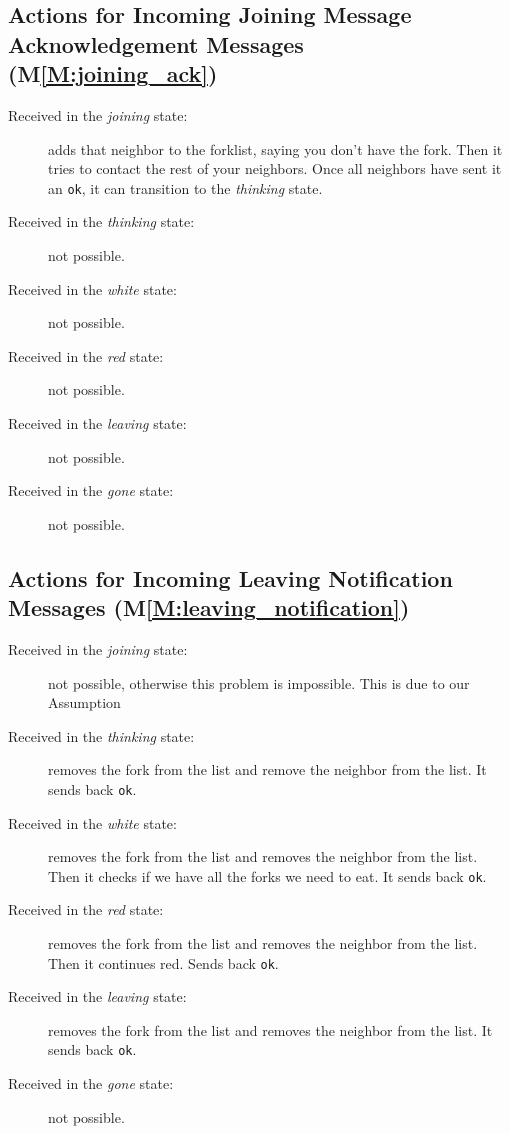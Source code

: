 \documentclass[11pt]{article}
\begin{document}
\subsection{Actions for Incoming Joining Message Acknowledgement Messages (M\ref{M:joining_ack})}
\begin{description}
\item[Received in the \textit{joining} state:] adds that neighbor to the forklist, saying you don't have the fork. Then it tries to contact the rest of your neighbors. Once all neighbors have sent it an \texttt{ok}, it can transition to the \emph{thinking} state.
\item[Received in the \textit{thinking} state:] not possible.
\item[Received in the \textit{white} state:] not possible.
\item[Received in the \textit{red} state:] not possible.
\item[Received in the \textit{leaving} state:] not possible.
\item[Received in the \textit{gone} state:] not possible.
\end{description}

\subsection{Actions for Incoming Leaving Notification Messages (M\ref{M:leaving_notification})}
\begin{description}
\item[Received in the \textit{joining} state:] not possible, otherwise this problem is impossible. This is due to our Assumption
\item[Received in the \textit{thinking} state:] removes the fork from the list and remove the neighbor from the list. It sends back \texttt{ok}.
\item[Received in the \textit{white} state:] removes the fork from the list and removes the neighbor from the list. Then it checks if we have all the forks we need to eat. It sends back \texttt{ok}.
\item[Received in the \textit{red} state:] removes the fork from the list and removes the neighbor from the list. Then it continues red. Sends back \texttt{ok}.
\item[Received in the \textit{leaving} state:] removes the fork from the list and removes the neighbor from the list. It sends back \texttt{ok}.
\item[Received in the \textit{gone} state:] not possible.
\end{description}
\end{document}
